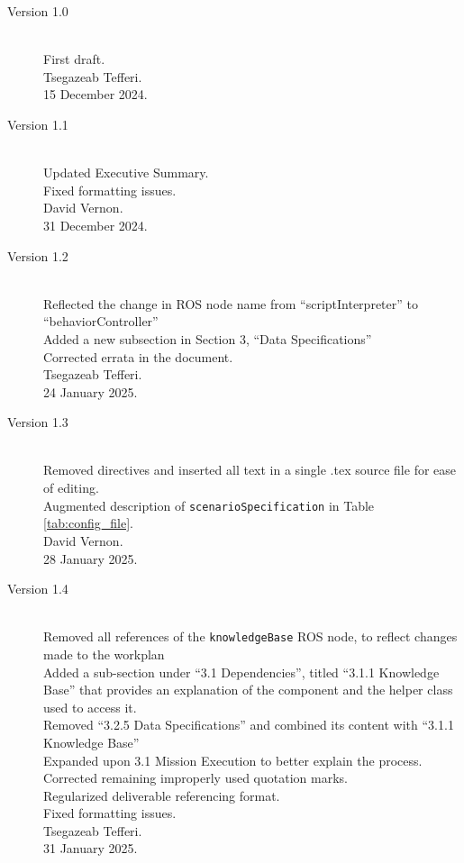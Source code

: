 \documentclass{CSSRforAfrica}
\begin{document}
\begin{description}

\item [Version 1.0]~\\
First draft. \\
Tsegazeab Tefferi. \\      
15 December 2024.             

\item [Version 1.1]~\\
Updated Executive Summary. \\
Fixed formatting issues. \\
David Vernon. \\           
31 December 2024.   

\item [Version 1.2]~\\
Reflected the change in ROS node name from ``scriptInterpreter'' to ``behaviorController'' \\
Added a new subsection in Section 3, ``Data Specifications'' \\
Corrected errata in the document. \\
Tsegazeab Tefferi. \\         
24 January 2025.                    

\item [Version 1.3]~\\
Removed \verb++ directives and inserted all text in a single .tex source file for ease of editing.\\
Augmented description of  \small{\texttt{\small scenarioSpecification}}  in Table \ref{tab:config_file}. \\
David Vernon. \\                            
28 January 2025.                                                     

\item [Version 1.4]~\\
Removed all references of the \texttt{\small knowledgeBase} ROS node, to reflect changes made to the workplan\\
Added a sub-section under ``3.1 Dependencies'', titled ``3.1.1 Knowledge Base'' that provides an explanation of the component and the helper class used to access it.\\
Removed ``3.2.5 Data Specifications'' and combined its content with ``3.1.1 Knowledge Base''\\
Expanded upon 3.1 Mission Execution to better explain the process. \\
Corrected remaining improperly used quotation marks. \\
Regularized deliverable referencing format. \\
Fixed formatting issues. \\
Tsegazeab Tefferi. \\                            
31 January 2025.  


\end{description}
\end{document}
